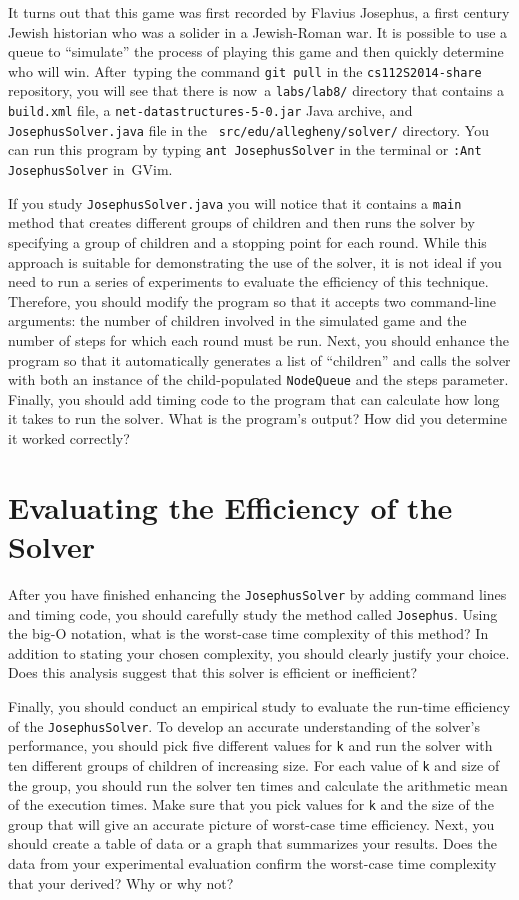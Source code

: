   It turns out that this game was first recorded by Flavius Josephus, a first century Jewish historian who was a solider
  in a Jewish-Roman war.  It is possible to use a queue to ``simulate'' the process of playing this game and then
  quickly determine who will win.  \mbox{After typing} the command {\tt git pull} in the {\tt cs112S2014-share}
  repository, you will see that there is \mbox{now a} {\tt labs/lab8/} directory that contains a {\tt build.xml} file, a
  {\tt net-datastructures-5-0.jar} Java archive, and {\tt JosephusSolver.java} file in the {\tt
    src/edu/allegheny/solver/} directory.  You can run this program by typing {\tt ant JosephusSolver} in the terminal
  or {\tt :Ant JosephusSolver} \mbox{in GVim}.

  If you study {\tt JosephusSolver.java} you will notice that it contains a {\tt main} method that creates different
  groups of children and then runs the solver by specifying a group of children and a stopping point for each round.
  While this approach is suitable for demonstrating the use of the solver, it is not ideal if you need to run a series
  of experiments to evaluate the efficiency of this technique. Therefore, you should modify the program so that it
  accepts two command-line arguments: the number of children involved in the simulated game and the number of steps for
  which each round must be run. Next, you should enhance the program so that it automatically generates a list of
  ``children'' and calls the solver with both an instance of the child-populated {\tt NodeQueue} and the steps
  parameter. Finally, you should add timing code to the program that can calculate how long it takes to run the solver.
  What is the program's output? How did you determine it worked correctly?

\section*{Evaluating the Efficiency of the Solver}

  After you have finished enhancing the {\tt JosephusSolver} by adding command lines and timing code, you should
  carefully study the method called {\tt Josephus}.  Using the big-O notation, what is the worst-case time complexity of
  this method?  In addition to stating your chosen complexity, you should clearly justify your choice. Does this
  analysis suggest that this solver is efficient or inefficient? 

  Finally, you should conduct an empirical study to evaluate the run-time efficiency of the {\tt JosephusSolver}.  To
  develop an accurate understanding of the solver's performance, you should pick five different values for {\tt k} and
  run the solver with ten different groups of children of increasing size. For each value of {\tt k} and size of the
  group, you should run the solver ten times and calculate the arithmetic mean of the execution times. Make sure that
  you pick values for {\tt k} and the size of the group that will give an accurate picture of worst-case time
  efficiency. Next, you should create a table of data or a graph that summarizes your results. Does the data from your
  experimental evaluation confirm the worst-case time complexity that your derived? Why or why not?
  
